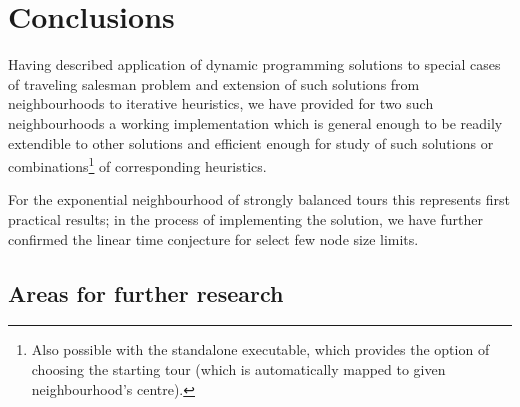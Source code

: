 \documentclass[index=totoc,bibliography=totoc]{scrartcl}
\numberwithin{equation}{section}
\numberwithin{figure}{section}
\numberwithin{table}{section}
\begin{document}
\section{Conclusions}
\vspace{0.87em}

Having described application of dynamic programming solutions to special
cases of traveling salesman problem and extension of such solutions
from neighbourhoods to iterative heuristics,
we have provided for two such neighbourhoods a working implementation which
is general enough to be readily extendible to other solutions and
efficient enough for study of such solutions or combinations\footnote{%
  Also possible with the standalone executable, which
  provides the option of choosing the starting tour
  (which is automatically mapped to given neighbourhood's centre).
}
of corresponding heuristics.

For the exponential neighbourhood of strongly balanced tours this
represents first practical results; in the process of implementing the solution,
we have further confirmed the linear time conjecture for select few node size limits.

\subsection{Areas for further research}
\end{document}
